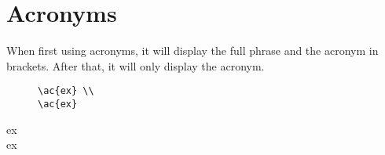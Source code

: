 \newpage 

\section{Acronyms}

When first using acronyms, it will display the full phrase and the acronym in brackets.
After that, it will only display the acronym.
\par 


\begin{figure}[H]
    \begin{verbatim}
\ac{ex} \\ 
\ac{ex}
    \end{verbatim}
\end{figure}

\noindent
\ac{ex} \\
\ac{ex}